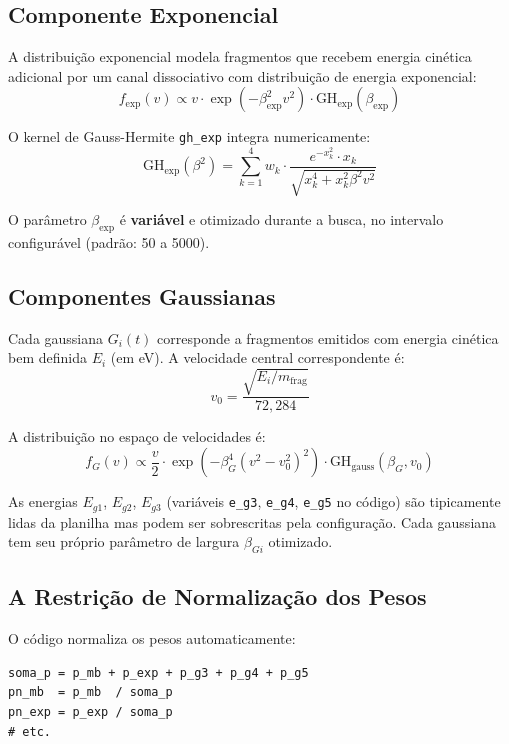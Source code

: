 \documentclass[12pt,a4paper]{report}
\newcommand{\code}[1]{\texttt{#1}}
\begin{document}
\subsection{Componente Exponencial}

A distribuição exponencial modela fragmentos que recebem energia cinética
adicional por um canal dissociativo com distribuição de energia exponencial:
\[
  f_{\text{exp}}(v) \propto v \cdot \exp\!\left(-\beta_{\text{exp}}^2 v^2\right)
  \cdot \text{GH}_{\text{exp}}(\beta_{\text{exp}})
\]

O kernel de Gauss-Hermite \code{gh\_exp} integra numericamente:
\[
  \text{GH}_{\text{exp}}(\beta^2) = \sum_{k=1}^{4} w_k \cdot
    \frac{e^{-x_k^2} \cdot x_k}{\sqrt{x_k^4 + x_k^2 \beta^2 v^2}}
\]

O parâmetro $\beta_{\text{exp}}$ é \textbf{variável} e otimizado durante
a busca, no intervalo configurável (padrão: 50 a 5000).

\subsection{Componentes Gaussianas}

Cada gaussiana $G_i(t)$ corresponde a fragmentos emitidos com energia cinética
bem definida $E_i$ (em eV). A velocidade central correspondente é:
\begin{equation}
  v_0 = \frac{\sqrt{E_i / m_{\text{frag}}}}{72{,}284}
  \label{eq:v0}
\end{equation}

A distribuição no espaço de velocidades é:
\[
  f_{G}(v) \propto \frac{v}{2} \cdot \exp\!\left(-\beta_G^4 (v^2 - v_0^2)^2\right)
  \cdot \text{GH}_{\text{gauss}}(\beta_G, v_0)
\]

As energias $E_{g1}$, $E_{g2}$, $E_{g3}$ (variáveis \code{e\_g3}, \code{e\_g4},
\code{e\_g5} no código) são tipicamente lidas da planilha mas podem ser
sobrescritas pela configuração. Cada gaussiana tem seu próprio parâmetro
de largura $\beta_{Gi}$ otimizado.

\subsection{A Restrição de Normalização dos Pesos}

O código normaliza os pesos automaticamente:
\begin{lstlisting}[caption={Normalização dos pesos em calcular\_espectro()}]
soma_p = p_mb + p_exp + p_g3 + p_g4 + p_g5
pn_mb  = p_mb  / soma_p
pn_exp = p_exp / soma_p
# etc.
\end{lstlisting}
\end{document}
